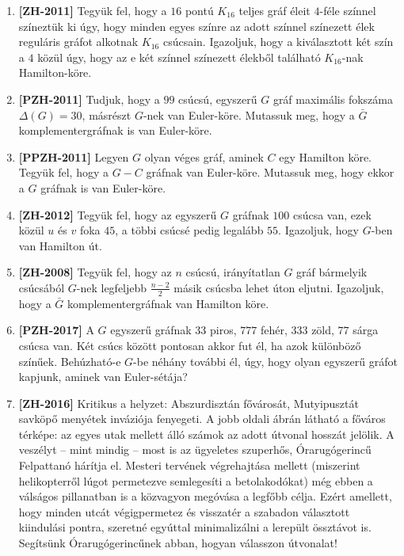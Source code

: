 \documentclass[a4paper,12pt]{article}
\begin{document}
\begin{enumerate}
            \item \textbf{[ZH-2011]} Tegyük fel, hogy a $16$ pontú $K_{16}$ teljes gráf éleit $4$-féle színnel színeztük ki úgy, hogy minden egyes színre az adott színnel színezett élek reguláris gráfot alkotnak $K_{16}$ csúcsain. Igazoljuk, hogy a kiválasztott két szín a $4$ közül úgy, hogy az e két színnel színezett élekből található $K_{16}$-nak Hamilton-köre.

            \item \textbf{[PZH-2011]} Tudjuk, hogy a $99$ csúcsú, egyszerű $G$ gráf maximális fokszáma $\Delta(G)=30$, másrészt $G$-nek van Euler-köre. Mutassuk meg, hogy a $\bar{G}$ komplementergráfnak is van Euler-köre.

            \item \textbf{[PPZH-2011]} Legyen $G$ olyan véges gráf, aminek $C$ egy Hamilton köre. Tegyük fel, hogy a $G-C$ gráfnak van Euler-köre. Mutassuk meg, hogy ekkor a $G$ gráfnak is van Euler-köre.

            \item \textbf{[ZH-2012]} Tegyük fel, hogy az egyszerű $G$ gráfnak $100$ csúcsa van, ezek közül $u$ és $v$ foka $45$, a többi csúcsé pedig legalább $55$. Igazoljuk, hogy $G$-ben van Hamilton út.

            \item \textbf{[ZH-2008]} Tegyük fel, hogy az $n$ csúcsú, irányítatlan $G$ gráf bármelyik csúcsából $G$-nek legfeljebb $\frac{n-2}{2}$ másik csúcsba lehet úton eljutni. Igazoljuk, hogy a $\bar{G}$ komplementergráfnak van Hamilton köre.

            \item \textbf{[PZH-2017]} A $G$ egyszerű gráfnak $33$ piros, $777$ fehér, $333$ zöld, $77$ sárga csúcsa van. Két csúcs között pontosan akkor fut él, ha azok különböző színűek. Behúzható-e $G$-be néhány további él, úgy, hogy olyan egyszerű gráfot kapjunk, aminek van Euler-sétája?

            \item \textbf{[ZH-2016]} Kritikus a helyzet: Abszurdisztán fővárosát, Mutyipusztát savköpő menyétek inváziója fenyegeti. A jobb oldali ábrán látható a főváros térképe: az egyes utak mellett álló számok az adott útvonal hosszát jelölik. A veszélyt -- mint mindig -- most is az ügyeletes szuperhős, Órarugógerincű Felpattanó hárítja el. Mesteri tervének végrehajtása mellett (miszerint helikopterről lúgot permetezve semlegesíti a betolakodókat) még ebben a válságos pillanatban is a közvagyon megóvása a legfőbb célja. Ezért amellett, hogy minden utcát végigpermetez és visszatér a szabadon választott kiindulási pontra, szeretné egyúttal minimalizálni a lerepült össztávot is. Segítsünk Órarugógerincűnek abban, hogyan válasszon útvonalat!
            \begin{figure}[h]
                \centering
                
            \end{figure}


\end{enumerate}
\end{document}
